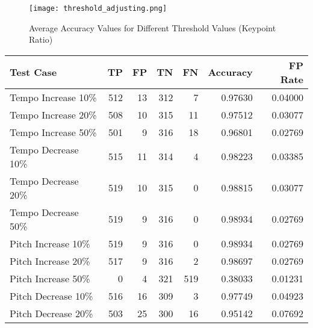 \begin{figure}[H]
    \centering
    \texttt{[image: threshold\_adjusting.png]}
    \caption{Average Accuracy Values for Different Threshold Values (Keypoint Ratio)}
    \label{fig:threshold_new}
  \end{figure}

\begin{table}[H]
    \begin{tabular}{|l|r|r|r|r|r|r|}
        \hline
        \textbf{Test Case}                 & \textbf{TP}   & \textbf{FP} & \textbf{TN} & \textbf{FN} & \textbf{Accuracy} & \textbf{FP Rate} \\ \hline
        Tempo Increase 10\%                & 512         & 13          & 312         & 7           & 0.97630           & 0.04000          \\ \hline
        Tempo Increase 20\%                & 508         & 10          & 315         & 11          & 0.97512           & 0.03077          \\ \hline
        Tempo Increase 50\%                & 501         & 9           & 316         & 18          & 0.96801           & 0.02769          \\ \hline
        Tempo Decrease 10\%                & 515         & 11          & 314         & 4           & 0.98223           & 0.03385          \\ \hline
        Tempo Decrease 20\%                & 519         & 10          & 315         & 0           & 0.98815           & 0.03077          \\ \hline
        Tempo Decrease 50\%                & 519         & 9           & 316         & 0           & 0.98934           & 0.02769          \\ \hline
        Pitch Increase 10\%                & 519         & 9           & 316         & 0           & 0.98934           & 0.02769          \\ \hline
        Pitch Increase 20\%                & 517         & 9           & 316         & 2           & 0.98697           & 0.02769          \\ \hline
        Pitch Increase 50\%                & 0           & 4           & 321         & 519         & 0.38033           & 0.01231          \\ \hline
        Pitch Decrease 10\%                & 516         & 16          & 309         & 3           & 0.97749           & 0.04923          \\ \hline
        Pitch Decrease 20\%                & 503         & 25          & 300         & 16          & 0.95142           & 0.07692          \\ \hline

\end{tabular}
\end{table}
